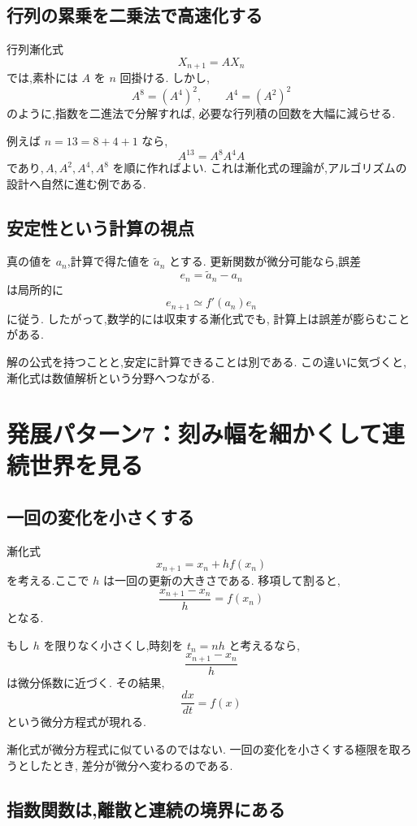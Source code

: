 \subsection{行列の累乗を二乗法で高速化する}

行列漸化式
\[
  X_{n+1}=AX_n
\]
では,素朴には $A$ を $n$ 回掛ける.
しかし,
\[
  A^8=(A^4)^2,\qquad
  A^4=(A^2)^2
\]
のように,指数を二進法で分解すれば,
必要な行列積の回数を大幅に減らせる.

例えば $n=13=8+4+1$ なら,
\[
  A^{13}=A^8A^4A
\]
であり,\,$A,A^2,A^4,A^8$ を順に作ればよい.
これは漸化式の理論が,アルゴリズムの設計へ自然に進む例である.

\subsection{安定性という計算の視点}

真の値を $a_n$,計算で得た値を $\widetilde a_n$ とする.
更新関数が微分可能なら,誤差
\[
  e_n=\widetilde a_n-a_n
\]
は局所的に
\[
  e_{n+1}\simeq f'(a_n)e_n
\]
に従う.
したがって,数学的には収束する漸化式でも,
計算上は誤差が膨らむことがある.

解の公式を持つことと,安定に計算できることは別である.
この違いに気づくと,漸化式は数値解析という分野へつながる.

\section{発展パターン7：刻み幅を細かくして連続世界を見る}

\subsection{一回の変化を小さくする}

漸化式
\[
  x_{n+1}=x_n+h f(x_n)
\]
を考える.ここで $h$ は一回の更新の大きさである.
移項して割ると,
\[
  \frac{x_{n+1}-x_n}{h}=f(x_n)
\]
となる.

もし $h$ を限りなく小さくし,時刻を $t_n=nh$ と考えるなら,
\[
  \frac{x_{n+1}-x_n}{h}
\]
は微分係数に近づく.
その結果,
\[
  \frac{dx}{dt}=f(x)
\]
という微分方程式が現れる.

漸化式が微分方程式に似ているのではない.
一回の変化を小さくする極限を取ろうとしたとき,
差分が微分へ変わるのである.

\subsection{指数関数は,離散と連続の境界にある}

